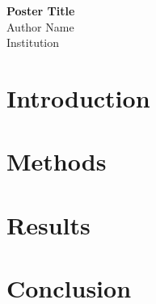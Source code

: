 \documentclass[a0,landscape]{a0poster}
\begin{document}
\begin{center}
\textbf{\Huge Poster Title}\\[1cm]
{\Large Author Name}\\
Institution
\end{center}

\begin{multicols}{3}
\section*{Introduction}

\section*{Methods}

\section*{Results}

\section*{Conclusion}
\end{multicols}
\end{document}
